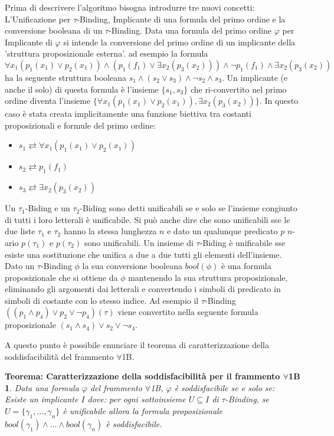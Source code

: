 \documentclass[./main.tex]{subfiles}
\begin{document}
Prima di descrivere l'algoritmo bisogna introdurre tre nuovi concetti:
L'Unificazione per $\tau$-Binding, Implicante di una formula del primo ordine e la conversione booleana di un $\tau$-Binding.
Data una formula del primo ordine $\varphi$ per Implicante di $\varphi$ si intende la conversione del primo ordine di
un implicante della 'struttura proposizionale esterna'.
ad esempio la formula
$\forall x_1 (p_1(x_1) \lor p_2(x_1)) \land (p_1(f_1) \lor \exists x_2 (p_3(x_2))) \land \lnot p_1(f_1) \land \exists x_2 (p_3(x_2))$
ha la seguente struttura booleana  $s_1 \land (s_2 \lor s_3) \land \lnot s_2 \land s_3$.
Un implicante (e anche il solo) di questa formula è l'insieme $\{s_1, s_3\}$ che ri-convertito nel primo ordine diventa
l'insieme $\{\forall x_1 (p_1(x_1) \lor p_2(x_1)), \exists x_2 (p_3(x_2))\}$.
In questo caso è stata creata implicitamente una funzione biettiva tra costanti proposizionali e formule del primo ordine:
\begin{itemize}
    \item $s_1 \rightleftarrows \forall x_1 (p_1(x_1) \lor p_2(x_1))$
    \item $s_2 \rightleftarrows p_1(f_1)$
    \item $s_3 \rightleftarrows \exists x_2 (p_3(x_2))$
\end{itemize}
Un $\tau_1$-Biding e un $\tau_2$-Biding sono detti unificabili se e solo se l'insieme congiunto di tutti i loro letterali è unificabile.
Si può anche dire che sono unificabili sse 
le due liste $\tau_1$ e $\tau_2$ hanno la stessa lunghezza $n$ e dato un qualunque predicato $p$ $n$-ario
$p(\tau_1)$ e $p(\tau_2)$ sono unificabili. 
Un insieme di $\tau$-Biding è unificabile sse esiste una sostituzione che unifica a due a due tutti gli elementi dell'insieme.
Dato un $\tau$-Binding $\phi$ la sua conversione booleana $bool(\phi)$ è una formula proposizionale che si ottiene 
da $\phi$ mantenendo la sua struttura proposizionale, eliminando gli argomenti dai letterali e convertendo
i simboli di predicato in simboli di costante con lo stesso indice. Ad esempio il $\tau$-Binding
$((p_1 \land p_4) \lor p_2 \lor \lnot p_4)(\tau)$ viene convertito nella seguente formula proposizionale $(s_1 \land s_4) \lor s_2 \lor \lnot s_4$.

A questo punto è possibile enunciare il teorema di caratterizzazione della soddisfacibilità del frammento $\forall$1B.

\newtheorem{forall1bsat}[thm]{Teorema: Caratterizzazione della soddisfacibilità per il frammento $\forall$1B}
\begin{forall1bsat}
    Data una formula $\varphi$ del frammento $\forall$1B, $\varphi$ è soddisfacibile se e solo se: \\
    Esiste un implicante $I$ dove: per ogni sottoinsieme $U \subseteq I$ di $\tau$-Binding,
    se $U=\{\gamma_1, ..., \gamma_n\}$ è unificabile allora la formula proposizionale $bool(\gamma_1) \land ... \land bool(\gamma_n)$ è soddisfacibile.
\end{forall1bsat}
\end{document}
